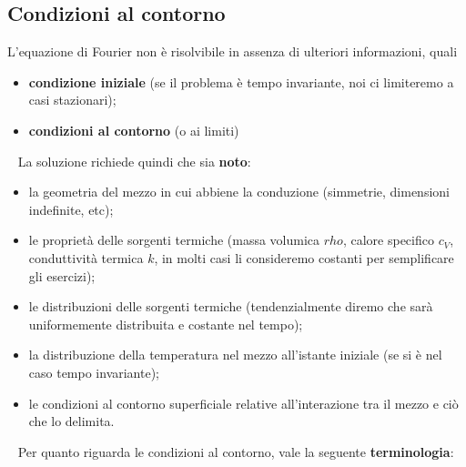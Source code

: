 \subsection{Condizioni al contorno}
L’equazione di Fourier non è risolvibile in assenza di ulteriori informazioni, quali
\begin{itemize}
    \item \textbf{condizione iniziale} (se il problema è tempo invariante, noi ci limiteremo a casi stazionari);
    \item \textbf{condizioni al contorno} (o ai limiti)
\end{itemize}
\ \newline
La soluzione richiede quindi che sia \textbf{noto}:
\begin{itemize}
    \item la geometria del mezzo in cui abbiene la conduzione (simmetrie, dimensioni indefinite, etc);
    \item le proprietà delle sorgenti termiche (massa volumica $rho$, calore specifico $c_V$, conduttività termica $k$, in molti casi li consideremo costanti per semplificare gli esercizi);
    \item le distribuzioni delle sorgenti termiche (tendenzialmente diremo che sarà uniformemente distribuita e costante nel tempo);
    \item la distribuzione della temperatura nel mezzo all'istante iniziale (se si è nel caso tempo invariante);
    \item le condizioni al contorno superficiale relative all'interazione tra il mezzo e ciò che lo delimita.
\end{itemize}
\ \newline
Per quanto riguarda le condizioni al contorno, vale la seguente \textbf{terminologia}:
